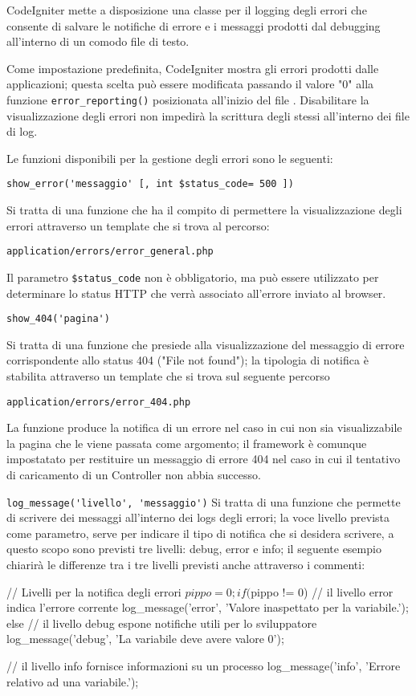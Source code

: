 CodeIgniter mette a disposizione una classe per il logging degli errori che consente di salvare le notifiche di errore e i messaggi prodotti dal debugging all'interno di un comodo file di testo.

Come impostazione predefinita, CodeIgniter mostra gli errori prodotti dalle applicazioni; questa scelta può essere modificata passando il valore "0" alla funzione \verb|error_reporting()| posizionata all'inizio del file .
Disabilitare la visualizzazione degli errori non impedirà la scrittura degli stessi all'interno dei file di log.

Le funzioni disponibili per la gestione degli errori sono le seguenti:

\verb|show_error('messaggio' [, int $status_code= 500 ])|

Si tratta di una funzione che ha il compito di permettere la visualizzazione degli errori attraverso un template che si trova al percorso:

\verb|application/errors/error_general.php|

Il parametro \verb|$status_code| non è obbligatorio, ma può essere utilizzato per determinare lo status \ac{HTTP} che verrà associato all'errore inviato al browser.

\verb|show_404('pagina')|

Si tratta di una funzione che presiede alla visualizzazione del messaggio di errore corrispondente allo status 404 ("File not found"); la tipologia di notifica è stabilita attraverso un template che si trova sul seguente percorso

\verb|application/errors/error_404.php|

La funzione produce la notifica di un errore nel caso in cui non sia visualizzabile la pagina che le viene passata come argomento; il framework è comunque impostatato per restituire un messaggio di errore 404 nel caso in cui il tentativo di caricamento di un Controller non abbia successo.

\verb|log_message('livello', 'messaggio')|
Si tratta di una funzione che permette di scrivere dei messaggi all'interno dei logs degli errori; la voce livello prevista come parametro, serve per indicare il tipo di notifica che si desidera scrivere, a questo scopo sono previsti tre livelli: debug, error e info; il seguente esempio chiarirà le differenze tra i tre livelli previsti anche attraverso i commenti:

\begin{code}
// Livelli per la notifica degli errori
$pippo = 0; 
if ($pippo != 0)
{
  // il livello error indica l'errore corrente
  log_message('error', 'Valore inaspettato per la variabile.');
}
else
{
  // il livello debug espone notifiche utili per lo sviluppatore 
  log_message('debug', 'La variabile deve avere valore 0');
}

// il livello info fornisce informazioni su un processo
log_message('info', 'Errore relativo ad una variabile.');
\end{code}

